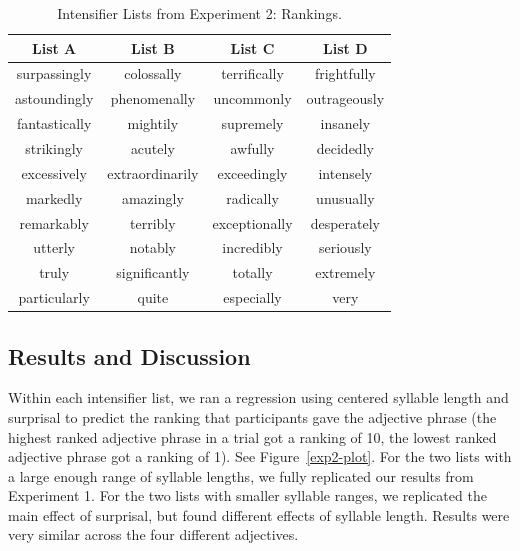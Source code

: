 \documentclass[10pt,letterpaper]{article}
\begin{document}
\begin{table}[ht]
\begin{center} 
\caption{Intensifier Lists from Experiment 2: Rankings.} 
\label{exp2-intensifiers} 
\vskip 0.12in
\begin{tabular}{cccc} 
\hline
List A    &  List B & List C & List D \\
\hline
surpassingly & colossally & terrifically & frightfully \\
astoundingly & phenomenally & uncommonly & outrageously \\
fantastically & mightily & supremely & insanely \\
strikingly & acutely & awfully & decidedly \\
excessively & extraordinarily & exceedingly & intensely \\
markedly & amazingly & radically & unusually \\
remarkably & terribly & exceptionally & desperately \\
utterly & notably & incredibly & seriously \\
truly & significantly & totally & extremely \\
particularly & quite & especially & very
\end{tabular}
\end{center}
\end{table}

\subsection{Results and Discussion}

Within each intensifier list, we ran a regression using centered syllable length and surprisal to predict the ranking that participants gave the adjective phrase (the highest ranked adjective phrase in a trial got a ranking of 10, the lowest ranked adjective phrase got a ranking of 1).
See Figure~\ref{exp2-plot}.
For the two lists with a large enough range of syllable lengths, we fully replicated our results from Experiment 1.
For the two lists with smaller syllable ranges, we replicated the main effect of surprisal, but found different effects of syllable length.
Results were very similar across the four different adjectives.
\end{document}
